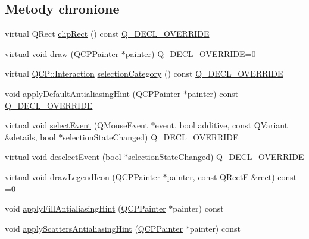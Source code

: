 \subsection*{Metody chronione}
\begin{DoxyCompactItemize}
\item 
virtual Q\+Rect \hyperlink{class_q_c_p_abstract_plottable_a635cee3effc07ad421414c76fd83548c}{clip\+Rect} () const \hyperlink{qcustomplot_8hh_a42cc5eaeb25b85f8b52d2a4b94c56f55}{Q\+\_\+\+D\+E\+C\+L\+\_\+\+O\+V\+E\+R\+R\+I\+DE}
\item 
virtual void \hyperlink{class_q_c_p_abstract_plottable_a453f676a5cee7bf846c5f0fa05ea84b3}{draw} (\hyperlink{class_q_c_p_painter}{Q\+C\+P\+Painter} $\ast$painter) \hyperlink{qcustomplot_8hh_a42cc5eaeb25b85f8b52d2a4b94c56f55}{Q\+\_\+\+D\+E\+C\+L\+\_\+\+O\+V\+E\+R\+R\+I\+DE}=0
\item 
virtual \hyperlink{namespace_q_c_p_a2ad6bb6281c7c2d593d4277b44c2b037}{Q\+C\+P\+::\+Interaction} \hyperlink{class_q_c_p_abstract_plottable_af80ad8531642e786b6f4fad551c203c4}{selection\+Category} () const \hyperlink{qcustomplot_8hh_a42cc5eaeb25b85f8b52d2a4b94c56f55}{Q\+\_\+\+D\+E\+C\+L\+\_\+\+O\+V\+E\+R\+R\+I\+DE}
\item 
void \hyperlink{class_q_c_p_abstract_plottable_ac032077fb0db93d6faa3273d02363398}{apply\+Default\+Antialiasing\+Hint} (\hyperlink{class_q_c_p_painter}{Q\+C\+P\+Painter} $\ast$painter) const \hyperlink{qcustomplot_8hh_a42cc5eaeb25b85f8b52d2a4b94c56f55}{Q\+\_\+\+D\+E\+C\+L\+\_\+\+O\+V\+E\+R\+R\+I\+DE}
\item 
virtual void \hyperlink{class_q_c_p_abstract_plottable_a2d488568cf16600dd81fa23d7d439829}{select\+Event} (Q\+Mouse\+Event $\ast$event, bool additive, const Q\+Variant \&details, bool $\ast$selection\+State\+Changed) \hyperlink{qcustomplot_8hh_a42cc5eaeb25b85f8b52d2a4b94c56f55}{Q\+\_\+\+D\+E\+C\+L\+\_\+\+O\+V\+E\+R\+R\+I\+DE}
\item 
virtual void \hyperlink{class_q_c_p_abstract_plottable_a9b104d9da4f38f934363945c313bf82e}{deselect\+Event} (bool $\ast$selection\+State\+Changed) \hyperlink{qcustomplot_8hh_a42cc5eaeb25b85f8b52d2a4b94c56f55}{Q\+\_\+\+D\+E\+C\+L\+\_\+\+O\+V\+E\+R\+R\+I\+DE}
\item 
virtual void \hyperlink{class_q_c_p_abstract_plottable_a9a450783fd9ed539e589999fd390cdf7}{draw\+Legend\+Icon} (\hyperlink{class_q_c_p_painter}{Q\+C\+P\+Painter} $\ast$painter, const Q\+RectF \&rect) const =0
\item 
void \hyperlink{class_q_c_p_abstract_plottable_ac08a480155895e674dbfe5a5670e0ff3}{apply\+Fill\+Antialiasing\+Hint} (\hyperlink{class_q_c_p_painter}{Q\+C\+P\+Painter} $\ast$painter) const 
\item 
void \hyperlink{class_q_c_p_abstract_plottable_a753272ee225a62827e90c3e1e78de4b1}{apply\+Scatters\+Antialiasing\+Hint} (\hyperlink{class_q_c_p_painter}{Q\+C\+P\+Painter} $\ast$painter) const 
\end{DoxyCompactItemize}
